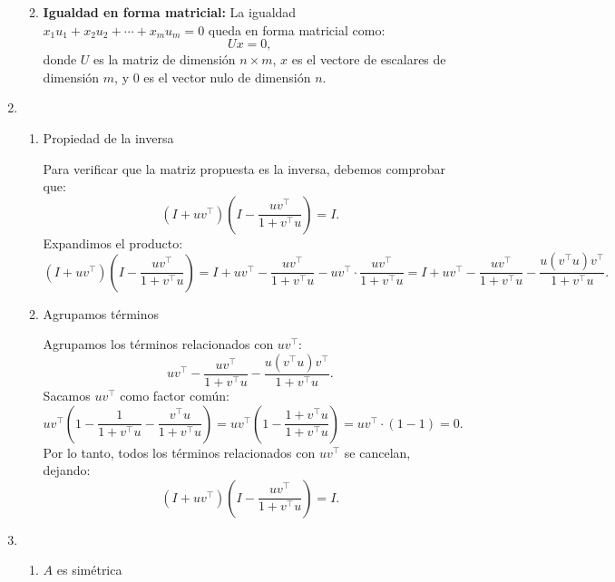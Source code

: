 \begin{enumerate}[label=\color{red}\textbf{\arabic*)}]
\begin{enumerate}[label=\arabic*)]
\[\]  
\item \textbf{Igualdad en forma matricial:} La igualdad $x_1u_1+x_2u_2+\cdots+x_m u_m=0$ queda en forma matricial como: \[
Ux=0,
\]  donde $U$ es la matriz de dimensión $n\times m$, $x$ es el vectore de escalares de dimensión $m$, y  $0$ es el vector nulo de dimensión $n$.
    \end{enumerate}
\item {} 

\begin{enumerate}[label=Paso \arabic*:]
    \item Propiedad de la inversa

        Para verificar que la matriz propuesta es la inversa, debemos comprobar que: \[
            (I+uv^\intercal)\left( I-\dfrac{uv^\intercal}{1+v^\intercal u} \right) =I.
        \] 
        Expandimos el producto: \[
            (I+uv^\intercal)\left( I-\dfrac{uv^\intercal}{1+v^\intercal u} \right) =I+uv^\intercal-\dfrac{uv^\intercal}{1+v^\intercal u}-uv^\intercal\cdot \dfrac{uv^\intercal}{1+v^\intercal u}=I+uv^\intercal-\dfrac{uv^\intercal}{1+v^\intercal u}-\dfrac{u(v^\intercal u)v^\intercal}{1+v^\intercal u}.
        \] 
    \item Agrupamos términos

        Agrupamos los términos relacionados con $uv^\intercal$: \[
        uv^\intercal-\dfrac{uv^\intercal}{1+v^\intercal u}-\dfrac{u(v^\intercal u)v^\intercal}{1+v^\intercal u}.
        \] 
        Sacamos $uv^\intercal$ como factor común: \[
        uv^\intercal\left( 1-\dfrac{1}{1+v^\intercal u}-\dfrac{v^\intercal u}{1+v^\intercal u} \right)=uv^\intercal\left( 1-\dfrac{1+v^\intercal u}{1+v^\intercal u} \right) =uv^\intercal\cdot (1-1)=0 .
        \] 
        Por lo tanto, todos los términos relacionados con $uv^\intercal$ se cancelan, dejando: \[
            (I+uv^\intercal)\left( I-\dfrac{uv^\intercal}{1+v^\intercal u} \right) =I.
        \] 
\end{enumerate}
\item {}

    \begin{enumerate}[label=Parte \arabic*:]
        \item $A$ es simétrica


\end{enumerate}
\end{enumerate}

